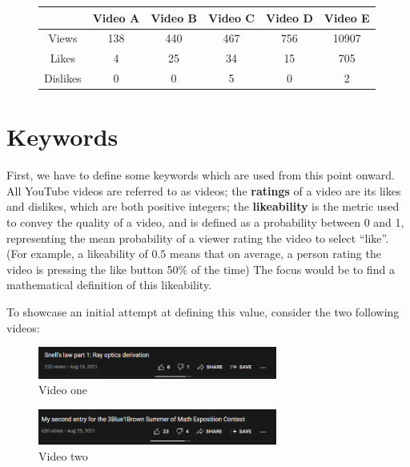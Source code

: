 \documentclass[a4paper,11pt]{article}
\begin{document}
\begin{figure}[H]
    \centering
    \begin{tabular}{c|c|c|c|c|c}
        & Video A & Video B & Video C & Video D & Video E \\
        \hline
        \hline
        Views & 138 & 440 & 467 & 756 & 10907 \\
        \hline
        Likes & 4 & 25 & 34 & 15 & 705 \\
        \hline
        Dislikes & 0 & 0 & 5 & 0 & 2
    \end{tabular}
    \label{tbl:videos}
\end{figure}


\section{Keywords}

First, we have to define some keywords which are used from this point onward. All YouTube videos are referred to as videos; the \textbf{ratings} of a video are its likes and dislikes, which are both positive integers; the \textbf{likeability} is the metric used to convey the quality of a video, and is defined as a probability between 0 and 1, representing the mean probability of a viewer rating the video to select ``like''. (For example, a likeability of $0.5$ means that on average, a person rating the video is pressing the like button 50\% of the time) The focus would be to find a mathematical definition of this likeability.

To showcase an initial attempt at defining this value, consider the two following videos:

\begin{figure}[H]
    \centering
    \includegraphics[width=0.7\textwidth]{assets/s_vid2.png}
    \caption{Video one \parencite{fluency_2021}}
    \label{fig:vid1}
\end{figure}

\begin{figure}[H]
    \centering
    \includegraphics[width=0.7\textwidth]{assets/s_vid1.png}
    \caption{Video two \parencite{division_2021}}
    \label{fig:vid2}
\end{figure}
\end{document}
